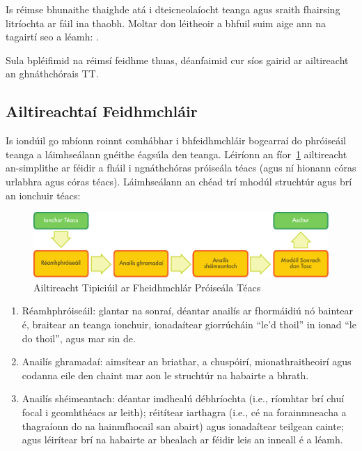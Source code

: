 \begin{multicols}{2}
Is réimse bhunaithe thaighde atá i dteicneolaíocht teanga agus sraith fhairsing litríochta ar fáil ina thaobh. Moltar don léitheoir a bhfuil suim aige ann na tagairtí seo a léamh: \cite{carstensen-etal1} \cite{jurafsky-martin01} \cite{manning-schuetze1} \cite{lt-world1} \cite{lt-survey1}. %

Sula bpléifimid na réimsí feidhme thuas, déanfaimid cur síos gairid ar ailtireacht an ghnáthchórais TT.

\subsection{Ailtireachtaí Feidhmchláir}

Is iondúil go mbíonn roinnt comhábhar i bhfeidhmchláir bogearraí do phróiseáil teanga a láimhseálann gnéithe éagsúla den teanga. Léiríonn an fíor~\ref{fig:textprocessingarch_de} ailtireacht an-simplithe ar féidir a fháil i ngnáthchóras próiseála téacs (agus ní hionann córas urlabhra agus córas téacs). Láimhseálann an chéad trí mhodúl struchtúr agus brí an ionchuir téacs:

\begin{figure}[htb]
  \center
  \includegraphics[width=\textwidth]{../_media/irish/text_processing_app_architecture}
  \caption{Ailtireacht Tipiciúil ar Fheidhmchlár Próiseála Téacs}
  \label{fig:textprocessingarch_de}
\end{figure}

\begin{enumerate}
\item Réamhphróiseáil: glantar na sonraí, déantar anailís ar fhormáidiú nó baintear é, braitear an teanga ionchuir, ionadaítear giorrúcháin ``le'd thoil'' in ionad ``le do thoil'', agus mar sin de.
\item Anailís ghramadaí: aimsítear an briathar, a chuspóirí, mionathraitheoirí agus codanna eile den chaint mar aon le struchtúr na habairte a bhrath.
\item Anailís shéimeantach: déantar imdhealú débhríochta (i.e., ríomhtar brí chuí focal i gcomhthéacs ar leith); réitítear iarthagra (i.e., cé na forainmneacha a thagraíonn do na hainmfhocail san abairt) agus ionadaítear teilgean cainte; agus léirítear brí na habairte ar bhealach ar féidir leis an inneall é a léamh.
\end{enumerate}


\end{multicols}
